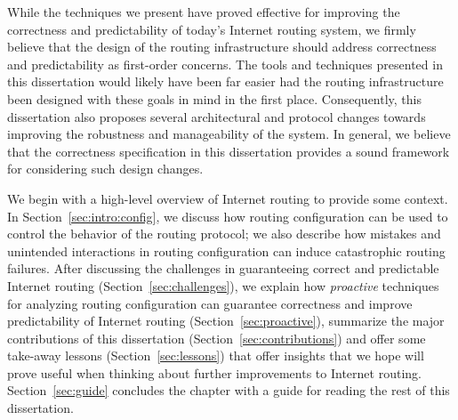 

While the techniques we present have proved effective for improving the
correctness and predictability of today's Internet routing system, we
firmly believe that the design of the routing infrastructure should
address correctness and predictability as first-order concerns.  The
tools and techniques presented in this dissertation would likely have
been far easier had the routing infrastructure been designed with these
goals in mind in the first place. Consequently, this dissertation also
proposes several architectural and protocol changes towards improving
the robustness and manageability of the system.  In general, we believe
that the correctness specification in this dissertation provides a sound
framework for considering such design changes.

We begin with a high-level overview of Internet routing to provide some
context.  In Section~\ref{sec:intro:config}, we discuss how routing
configuration can be used to control the behavior of the routing
protocol; we also describe how mistakes and unintended interactions in
routing configuration can induce catastrophic routing failures.  After
discussing the challenges in guaranteeing correct and predictable
Internet routing (Section~\ref{sec:challenges}), we explain how {\em
proactive} techniques for analyzing routing configuration can guarantee
correctness and improve predictability of Internet routing
(Section~\ref{sec:proactive}), summarize the major contributions of this
dissertation (Section~\ref{sec:contributions}) and offer some take-away
lessons (Section~\ref{sec:lessons}) that offer insights that we hope
will prove useful when thinking about further improvements to Internet
routing.
Section~\ref{sec:guide} concludes the chapter with a guide for reading
the rest of this dissertation.


